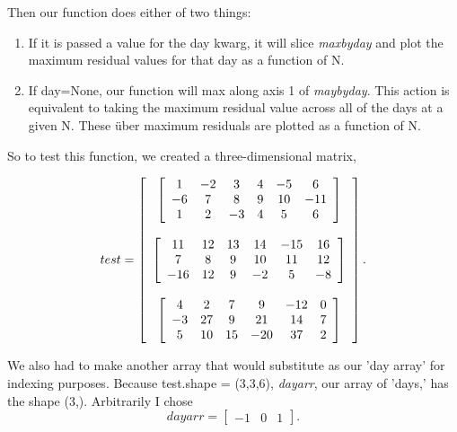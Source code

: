 \documentclass{article}
\begin{document}
Then our function does either of two things:
\begin{enumerate}
\item If it is passed a value for the day kwarg, it will slice
  \textit{maxbyday} and plot the maximum residual values for that day
  as a function of N.
\item If day=None, our function will max along axis 1 of \textit{maybyday}.
  This action is equivalent to taking the maximum residual value
  across all of the days at a given N.  These \"{u}ber maximum residuals
  are plotted as a function of N.
\end{enumerate}

So to test this function, we created a three-dimensional matrix,

\[test= \left[ \begin{array}[c]{c}
    
    \left[ \begin{array}[c]{cccccc}
        1 & -2 & 3 & 4 & -5 & 6 \\
        -6 & 7 & 8 & 9 & 10 & -11 \\
        1 & 2 & -3 & 4 & 5 & 6
        \end{array} \right] \\

      \\

    \left[ \begin{array}[c]{cccccc}
        11 & 12 & 13 & 14 & -15 & 16 \\
        7 & 8 & 9 & 10 & 11 & 12 \\
        -16 & 12 & 9 & -2 & 5 & -8 \\
        \end{array} \right] \\

      \\

    \left[ \begin{array}[c]{cccccc}
        4 & 2 & 7 & 9 & -12 & 0 \\
        -3 & 27 & 9 & 21 & 14 & 7 \\
        5 & 10 & 15 & -20 & 37 & 2 \\
    \end{array} \right]

\end{array} \right]. \]


We also had to make another array that would substitute as our 'day
array' for indexing purposes.  Because test.shape = (3,3,6),
\textit{dayarr}, our array of 'days,' has the shape (3,).  Arbitrarily
I chose \[dayarr=\left[\begin{array}{ccc} -1 & 0 & 1 \end{array}\right]. \]
\end{document}
